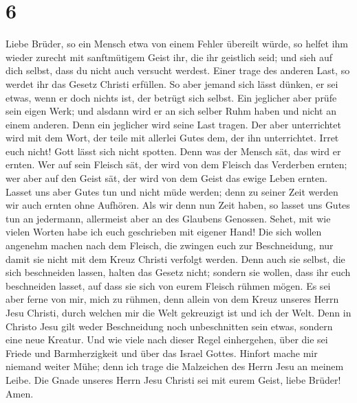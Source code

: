 \hypertarget{section-5}{%
\section{6}\label{section-5}}

 Liebe Brüder, so ein Mensch etwa von einem Fehler
übereilt würde, so helfet ihm wieder zurecht mit sanftmütigem Geist ihr,
die ihr geistlich seid; und sieh auf dich selbst, dass du nicht auch
versucht werdest.  Einer trage des anderen Last, so werdet
ihr das Gesetz Christi erfüllen.  So aber jemand sich
lässt dünken, er sei etwas, wenn er doch nichts ist, der betrügt sich
selbst.  Ein jeglicher aber prüfe sein eigen Werk; und
alsdann wird er an sich selber Ruhm haben und nicht an einem anderen.
 Denn ein jeglicher wird seine Last tragen. 
Der aber unterrichtet wird mit dem Wort, der teile mit allerlei Gutes
dem, der ihn unterrichtet.  Irret euch nicht! Gott lässt
sich nicht spotten. Denn was der Mensch sät, das wird er ernten.
 Wer auf sein Fleisch sät, der wird von dem Fleisch das
Verderben ernten; wer aber auf den Geist sät, der wird von dem Geist das
ewige Leben ernten.  Lasset uns aber Gutes tun und nicht
müde werden; denn zu seiner Zeit werden wir auch ernten ohne Aufhören.
 Als wir denn nun Zeit haben, so lasset uns Gutes tun an
jedermann, allermeist aber an des Glaubens Genossen. 
Sehet, mit wie vielen Worten habe ich euch geschrieben mit eigener Hand!
 Die sich wollen angenehm machen nach dem Fleisch, die
zwingen euch zur Beschneidung, nur damit sie nicht mit dem Kreuz Christi
verfolgt werden.  Denn auch sie selbst, die sich
beschneiden lassen, halten das Gesetz nicht; sondern sie wollen, dass
ihr euch beschneiden lasset, auf dass sie sich von eurem Fleisch rühmen
mögen.  Es sei aber ferne von mir, mich zu rühmen, denn
allein von dem Kreuz unseres Herrn Jesu Christi, durch welchen mir die
Welt gekreuzigt ist und ich der Welt.  Denn in Christo
Jesu gilt weder Beschneidung noch unbeschnitten sein etwas, sondern eine
neue Kreatur.  Und wie viele nach dieser Regel
einhergehen, über die sei Friede und Barmherzigkeit und über das Israel
Gottes.  Hinfort mache mir niemand weiter Mühe; denn ich
trage die Malzeichen des Herrn Jesu an meinem Leibe.  Die
Gnade unseres Herrn Jesu Christi sei mit eurem Geist, liebe Brüder!
Amen.
